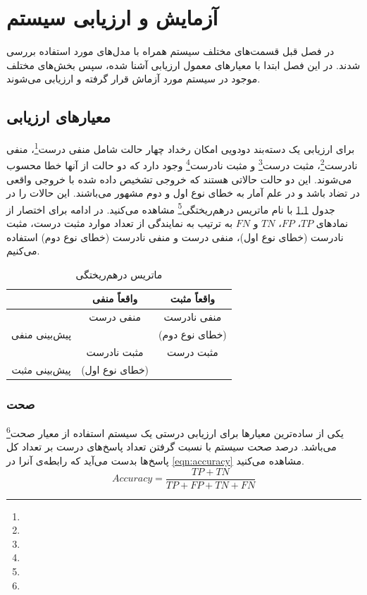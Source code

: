 \chapter{آزمایش و ارزیابی سیستم}
در فصل قبل قسمت‌های مختلف سیستم همراه با مدل‌های مورد استفاده بررسی شدند. در این فصل ابتدا با معیارهای معمول ارزیابی آشنا شده، سپس بخش‌های مختلف موجود در سیستم مورد آزماش قرار گرفته و ارزیابی می‌شوند.
\section{معیارهای ارزیابی}
برای ارزیابی یک دسته‌بند دودویی امکان رخداد چهار حالت شامل منفی درست\footnote{}، منفی نادرست\footnote{}، مثبت درست\footnote{} و مثبت نادرست\footnote{} وجود دارد که دو حالت از آنها خطا محسوب می‌شوند. این دو حالت حالاتی هستند که خروجی تشخیص داده شده با خروجی واقعی در تضاد باشد و در علم آمار به خطای نوع اول و دوم مشهور می‌باشند. این حالات را در جدول \ref{tab:hypo_test} با نام ماتریس درهم‌ریختگی\footnote{} مشاهده می‌کنید. در ادامه برای اختصار از نمادهای $TP$، $FP$، $TN$ و $FN$ به ترتیب به نمایندگی از تعداد موارد مثبت درست، مثبت نادرست (خطای نوع اول)، منفی درست و منفی نادرست (خطای نوع دوم) استفاده می‌کنیم.
\\

\begin{table}[h]
	\centering
	\def\arraystretch{1.6}
	\setlength{\tabcolsep}{20pt}
	\begin{tabular}{|c|c|c|}
		\cline{2-3}
		\multicolumn{1}{c|}{} & \cellcolor{headerColor}واقعاً منفی & \cellcolor{headerColor}واقعاً مثبت \\
		\hline
		\cellcolor{headerColor} & منفی درست & منفی نادرست \\
		\multirow{-2}{*}{\cellcolor{headerColor}پیش‌بینی منفی}& & (خطای نوع دوم) \\
		\hline
		\cellcolor{headerColor} & مثبت نادرست & مثبت درست \\
		\multirow{-2}{*}{\cellcolor{headerColor}پیش‌بینی مثبت} & (خطای نوع اول) & \\
		\hline
	\end{tabular}	
	\caption{ماتریس درهم‌ریختگی}
	\label{tab:hypo_test}
\end{table}	

\subsection{صحت}
یکی از ساده‌ترین معیارها برای ارزیابی درستی یک سیستم استفاده از معیار صحت\footnote{} می‌باشد. درصد صحت سیستم با نسبت گرفتن تعداد پاسخ‌های درست بر تعداد کل پاسخ‌ها بدست می‌آید که رابطه‌ی آنرا در \ref{eqn:accuracy} مشاهده می‌کنید.
\begin{equation}
\label{eqn:accuracy}
Accuracy = \frac{TP + TN}{TP + FP + TN + FN}
\end{equation}
